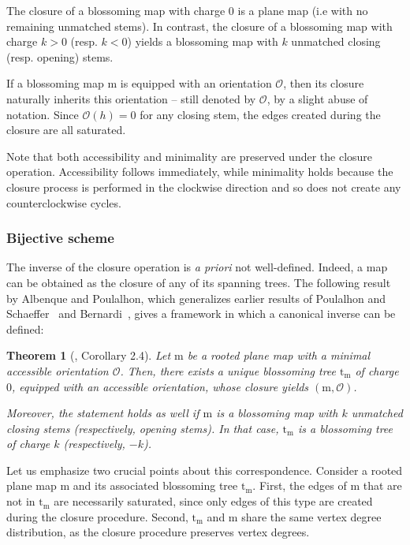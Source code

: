 \documentclass[11pt,reqno,tbtags]{amsart}
\renewcommand{\rm}{\mathrm{m}}
\newcommand{\rt}{\mathrm{t}}
\newtheorem{theo}{Theorem}
\numberwithin{equation}{section}
\numberwithin{theo}{section}
\theoremstyle{definition}
\newcommand{\cO}{\mathcal{O}}
\begin{document}
The closure of a blossoming map with charge 0 is a plane map (i.e with no remaining unmatched stems). In contrast, the closure of a blossoming map with charge $k>0$ (resp. $k<0$) yields a blossoming map with $k$ unmatched closing (resp. opening) stems.

If a blossoming map $\rm$ is equipped with an orientation $\cO$, then its closure naturally inherits this orientation -- still denoted by $\cO$, by a slight abuse of notation. Since $\cO(h)=0$ for any closing stem, the edges created during the closure are all saturated.

Note that both accessibility and minimality are preserved under the closure operation. Accessibility follows immediately, while minimality holds because the closure process is performed in the clockwise direction and so does not create any counterclockwise cycles.

		
		
		
		\subsubsection{Bijective scheme}
		The inverse of the closure operation is \emph{a priori} not well-defined. Indeed, a map can be obtained as the closure of any of its spanning trees. 
The following result by Albenque and Poulalhon, which generalizes earlier results of Poulalhon and Schaeffer~\cite{PouSch06} and Bernardi~\cite{Bernardi07}, gives a framework in which a canonical inverse can be defined:

\begin{theo}[\cite{AlbenquePoulalhon_Generic}, Corollary 2.4]\label{theo: AlbenquePoulalhonTheorem - Blossoming bijection for maps with an minimal accessible orientation}
Let $\rm$ be a rooted plane map with a minimal accessible orientation $\cO$. Then, there exists a unique blossoming tree $\rt_\rm$ of charge $0$, equipped with an accessible orientation, whose closure yields $(\rm,\cO)$.

Moreover, the statement holds as well if $\rm$ is a blossoming map with $k$ unmatched closing stems (respectively, opening stems). In that case, $\rt_\rm$ is a blossoming tree of charge $k$ (respectively, $-k$).
\end{theo}

Let us emphasize two crucial points about this correspondence. Consider a rooted plane map $\rm$ and its associated blossoming tree $\rt_\rm$. First, the edges of $\rm$ that are not in $\rt_\rm$ are necessarily saturated, since only edges of this type are created during the closure procedure. 
Second, $\rt_\rm$ and $\rm$ share the same vertex degree distribution, as the closure procedure preserves vertex degrees.
\end{document}
